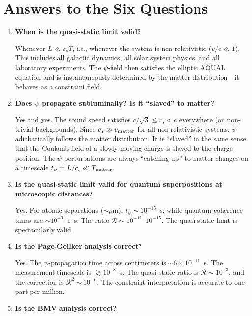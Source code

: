 \documentclass[12pt,a4paper]{article}
\begin{document}
\section{Answers to the Six Questions}
\label{sec:answers}

\begin{enumerate}
\item \textbf{When is the quasi-static limit valid?}

Whenever $L \ll c_s T$, i.e., whenever the system is non-relativistic
($v/c \ll 1$). This includes all galactic dynamics, all solar system
physics, and all laboratory experiments. The $\psi$-field then satisfies
the elliptic AQUAL equation and is instantaneously determined by the
matter distribution---it behaves as a constraint field.

\item \textbf{Does $\psi$ propagate subluminally? Is it ``slaved'' to
matter?}

Yes and yes. The sound speed satisfies $c/\sqrt{3} \leq c_s < c$
everywhere (on non-trivial backgrounds). Since $c_s \gg v_{\rm matter}$
for all non-relativistic systems, $\psi$ adiabatically follows the
matter distribution. It is ``slaved'' in the same sense that the
Coulomb field of a slowly-moving charge is slaved to the charge position.
The $\psi$-perturbations are always ``catching up'' to matter changes
on a timescale $t_\psi = L/c_s \ll T_{\rm matter}$.

\item \textbf{Is the quasi-static limit valid for quantum superpositions
at microscopic distances?}

Yes. For atomic separations ($\sim\mu$m), $t_\psi \sim 10^{-15}$~s,
while quantum coherence times are $\sim 10^{-3}$--$1$~s. The ratio
$\mathcal{R} \sim 10^{-12}$--$10^{-15}$. The quasi-static limit is
spectacularly valid.

\item \textbf{Is the Page-Geilker analysis correct?}

Yes. The $\psi$-propagation time across centimeters is
$\sim 6 \times 10^{-11}$~s. The measurement timescale is
$\gtrsim 10^{-8}$~s. The quasi-static ratio is $\mathcal{R} \sim 10^{-3}$,
and the correction is $\mathcal{R}^2 \sim 10^{-6}$. The constraint
interpretation is accurate to one part per million.

\item \textbf{Is the BMV analysis correct?}


\end{enumerate}
\end{document}

